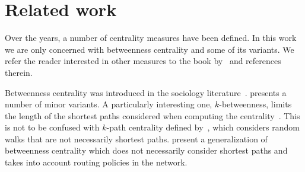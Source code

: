 \section{Related work}\label{sec:prevwork}
Over the years, a number of centrality measures have been defined. In this work
we are only concerned with betweenness centrality and some of its variants. We
refer the reader interested in other measures to the book by~\citet{Newman10} and
references therein.

Betweenness centrality was introduced in the sociology
literature~\citep{Anthonisse71,Freeman77}. \citet{Brandes08} presents a number
of minor variants. A particularly interesting one, $k$-betweenness, limits the
length of the shortest paths considered when computing the
centrality~\citep{BorgattiE06,Brandes08,PfefferC12}. This is not to be confused
with $k$-path centrality defined by~\citet{KourtellisASIT12}, which considers
random walks that are not necessarily shortest paths. \citet{DolevEP10} present
a generalization of betweenness centrality which does not necessarily consider
shortest paths and takes into account routing policies in the network. 

